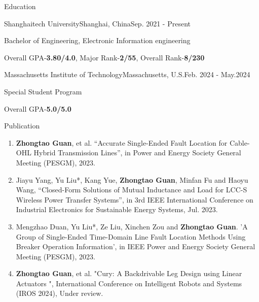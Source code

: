 \documentclass[]{ZhongtaoGuan_CV}
\begin{document}
\resumeheader
{}
{}
{}
{}
{}

\begin{section}{Education}
 \begin{subsectionnobullet}{Shanghaitech University}{Shanghai, China}{Sep. 2021 - Present}{}
     \item{Bachelor of Engineering, Electronic Information engineering}
     \item{Overall GPA-\textbf{3.80/4.0}, Major Rank-\textbf{2/55}, Overall Rank-\textbf{8/230}}
 \end{subsectionnobullet}
 
 \begin{subsectionnobullet}{Massachusetts Institute of Technology}{Massachusetts, U.S.}{Feb. 2024 - May.2024}{}
     \item {Special Student Program}
     \item {Overall GPA-\textbf{5.0/5.0}}
 \end{subsectionnobullet}
\end{section}


\begin{section}{Publication}
 \begin{enumerate}
     \item \textbf{Zhongtao Guan}, et al. “Accurate Single-Ended Fault Location for Cable-OHL Hybrid Transmission Lines”, in Power and Energy Society General Meeting (PESGM), 2023. %
     \item Jiayu Yang, Yu Liu*, Kang Yue, \textbf{Zhongtao Guan}, Minfan Fu and Haoyu Wang, “Closed-Form Solutions of Mutual Inductance and Load for LCC-S Wireless Power Transfer Systems”, in 3rd IEEE International Conference on Industrial Electronics for Sustainable Energy Systems, Jul. 2023.
     \item Mengzhao Duan, Yu Liu*, Ze Liu, Xinchen Zou and \textbf{Zhongtao Guan}. 'A Group of Single-Ended Time-Domain Line Fault Location Methods Using Breaker Operation Information', in IEEE Power and Energy Society General Meeting (PESGM), 2023.%
     \item \textbf{Zhongtao Guan}, et al. "Cury: A Backdrivable Leg Design using Linear Actuators ", International Conference on Intelligent Robots and Systems (IROS 2024), Under review.
 \end{enumerate}
\end{section}
\end{document}
